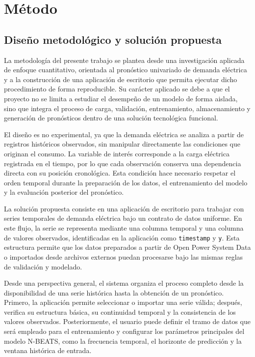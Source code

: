 \section{Método}

\subsection{Diseño metodológico y solución propuesta}

La metodología del presente trabajo se plantea desde una investigación aplicada de enfoque cuantitativo, orientada al pronóstico univariado de demanda eléctrica y a la construcción de una aplicación de escritorio que permita ejecutar dicho procedimiento de forma reproducible. Su carácter aplicado se debe a que el proyecto no se limita a estudiar el desempeño de un modelo de forma aislada, sino que integra el proceso de carga, validación, entrenamiento, almacenamiento y generación de pronósticos dentro de una solución tecnológica funcional.

El diseño es no experimental, ya que la demanda eléctrica se analiza a partir de registros históricos observados, sin manipular directamente las condiciones que originan el consumo. La variable de interés corresponde a la carga eléctrica registrada en el tiempo, por lo que cada observación conserva una dependencia directa con su posición cronológica. Esta condición hace necesario respetar el orden temporal durante la preparación de los datos, el entrenamiento del modelo y la evaluación posterior del pronóstico.

La solución propuesta consiste en una aplicación de escritorio para trabajar con series temporales de demanda eléctrica bajo un contrato de datos uniforme. En este flujo, la serie se representa mediante una columna temporal y una columna de valores observados, identificadas en la aplicación como \texttt{timestamp} y \texttt{y}. Esta estructura permite que los datos preparados a partir de Open Power System Data o importados desde archivos externos puedan procesarse bajo las mismas reglas de validación y modelado.

Desde una perspectiva general, el sistema organiza el proceso completo desde la disponibilidad de una serie histórica hasta la obtención de un pronóstico. Primero, la aplicación permite seleccionar o importar una serie válida; después, verifica su estructura básica, su continuidad temporal y la consistencia de los valores observados. Posteriormente, el usuario puede definir el tramo de datos que será empleado para el entrenamiento y configurar los parámetros principales del modelo N-BEATS, como la frecuencia temporal, el horizonte de predicción y la ventana histórica de entrada.

